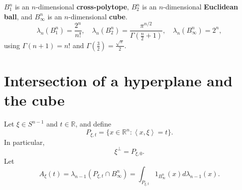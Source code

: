 \documentclass{article}
\newcommand{\inner}[2]{\left\langle #1, #2 \right\rangle}
\theoremstyle{definition}
\theoremstyle{definition}
\begin{document}
$B_1^n$ is an $n$-dimensional \textbf{cross-polytope},
$B_2^n$ is an $n$-dimensional \textbf{Euclidean ball},
and $B_\infty^n$ is an $n$-dimensional \textbf{cube}.
\[
\lambda_n(B_1^n) =\frac{2^n}{n!},
\quad \lambda_n(B_2^n) = \frac{\pi^{n/2}}{\Gamma(\frac{n}{2}+1)},
\quad \lambda_n(B_\infty^n) = 2^n,
\]
using $\Gamma(n+1)=n!$ and $\Gamma(\frac{3}{2})=\frac{\sqrt{\pi}}{2}$.



\section{Intersection of a hyperplane and the cube}
Let $\xi \in S^{n-1}$ and $t \in \mathbb{R}$,  and define
\[
P_{\xi,t} = \{x \in \mathbb{R}^n: \inner{x}{\xi}=t\}.
\]
In particular,
\[
\xi^\perp = P_{\xi,0}.
\]
Let 
\[
A_\xi(t) = \lambda_{n-1}(P_{\xi,t} \cap B_\infty^n) = 
\int_{P_{\xi,t}} 1_{B_\infty^n}(x) d\lambda_{n-1}(x).
\]
\end{document}
